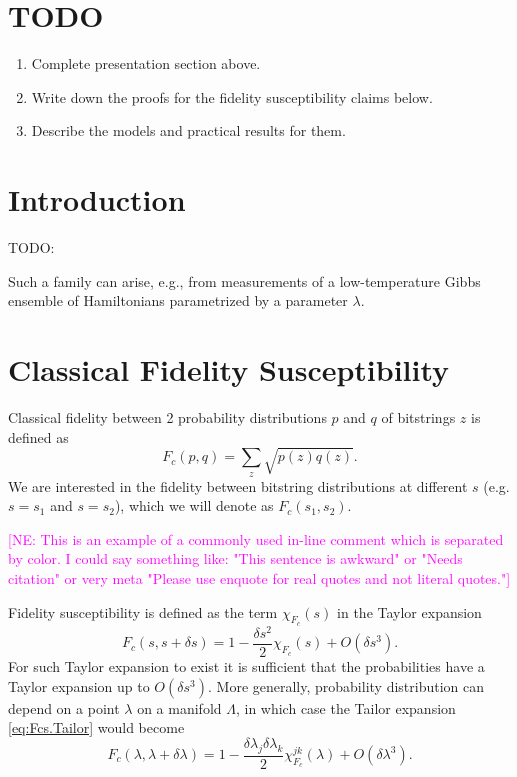 \documentclass[american,aps,pra,reprint,floatfix,nofootinbib,superscriptaddress]{revtex4-2}
\newcommand{\NE}[1]{\textcolor{magenta}{[NE: #1]}}
\begin{document}
\section{TODO}
\begin{enumerate}
\item Complete presentation section above.
\item Write down the proofs for the fidelity susceptibility claims below.
\item Describe the models and practical results for them.
\end{enumerate}

\section{Introduction}
TODO:

Such a family can arise, e.g., from measurements of a low-temperature
Gibbs ensemble of Hamiltonians parametrized by a parameter $\lambda$.

\section{Classical Fidelity Susceptibility}
Classical fidelity between 2 probability distributions $p$ and $q$ of
bitstrings $z$ is defined as
\begin{equation}
  F_c(p, q) = \sum_{z} \sqrt{p(z) q(z)}.
\end{equation}
We are interested in the fidelity between bitstring distributions at different
$s$ (e.g. $s=s_1$ and $s=s_2$), which we will denote as $F_c(s_1, s_2)$.

\NE{This is an example of a commonly used in-line comment which is separated by color. I could say something like: "This sentence is awkward" or "Needs citation" or very meta "Please use enquote for real quotes and not literal quotes."}

Fidelity susceptibility is defined as the term $\chi_{F_c}(s)$ in the Taylor
expansion
\begin{equation}
\label{eq:Fcs.Tailor}
  F_c(s, s+\delta s) = 1 - \frac{\delta s^2}{2} \chi_{F_c}(s) + O(\delta s^3).
\end{equation}
For such Taylor expansion to exist it is sufficient that the probabilities have
a Taylor expansion up to $O(\delta s^3)$. More generally, probability
distribution can depend on a point $\lambda$ on a manifold $\Lambda$,
in which case the Tailor expansion \eqref{eq:Fcs.Tailor} would become
\begin{equation}
\label{eq:Fcl.Tailor}
  F_c(\lambda, \lambda+\delta \lambda) = 1 - \frac{\delta \lambda_{j} \delta \lambda_k}{2} \chi_{F_c}^{jk}(\lambda) + O(\delta \lambda^3).
\end{equation}
\end{document}

